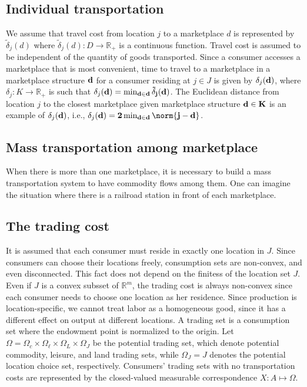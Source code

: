 \subsection{Individual transportation}

We assume that travel cost from location $j$ to a marketplace $d$ is represented by $\tilde{\delta}_j(d)$ where $\tilde{\delta}_j(d): D \to \mathbb{R}_+$ is a continuous function. Travel cost is assumed to be independent of the quantity of goods transported. Since a consumer accesses a marketplace that is most convenient, time to travel to a marketplace in a marketplace structure $\bf{d}$ for a consumer residing at $j \in J$ is given by $\delta_j(\bf{d})$, where $\delta_j: K \to \mathbb{R}_+$ is such that $\delta_j(\bf{d}) = \min_{d \in \bf{d}} \tilde{\delta}_j(d)$. The Euclidean distance from location $j$ to the closest marketplace given marketplace structure $\bf{d} \in K$ is an example of $\delta_j(\bf{d})$, i.e., $\delta_j(\bf{d}) = 2 \min_{d \in \bf{d}} \norm{j - d}$.

\subsection{Mass transportation among marketplace}

When there is more than one marketplace, it is necessary to build a mass transportation system to have commodity flows among them. One can imagine the situation where there is a railroad station in front of each marketplace.

\subsection{The trading cost}

It is assumed that each consumer must reside in exactly one location in $J$. Since consumers can choose their locations freely, consumption sets are non-convex, and even disconnected. This fact does not depend on the finitess of the location set $J$. Even if $J$ is a convex subsset of $\mathbb{R}^m$, the trading cost is always non-convex since each consumer needs to choose one location as her residence. Since production is location-specific, we cannot treat labor as a homogeneous good, since it has a different effect on output at different locations. A trading set is a consumption set where the endowment point is normalized to the origin. Let $\Omega = \Omega_c \times \Omega_{\ell} \times \Omega_L \times \Omega_J$ be the potential trading set, which denote potential commodity, leisure, and land trading sets, while $\Omega_J = J$ denotes the potential location choice set, respectively. Consumers' trading sets with no transportation costs are represented by the closed-valued measurable correspondence $X: A \mapsto \Omega$.